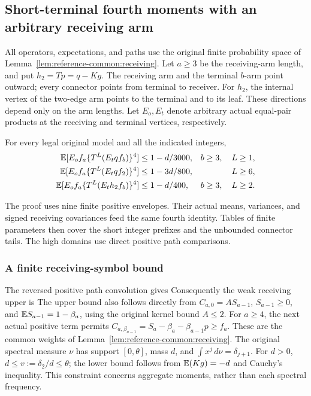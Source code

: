 \subsection{Short-terminal fourth moments with an arbitrary receiving arm}
\label{proof:Q5-C117}

All operators, expectations, and paths use the original finite
probability space of Lemma~\ref{lem:reference-common:receiving}.
Let \(a\ge3\) be the receiving-arm length, and put
\(h_2=Tp=q-Kg\). The receiving arm and the terminal \(b\)-arm
point outward; every connector points from terminal to receiver.
For \(h_2\), the internal vertex of the two-edge arm points to
the terminal and to its leaf. These directions depend only on the
arm lengths. Let \(E_o,E_t\) denote arbitrary actual equal-pair
products at the receiving and terminal vertices, respectively.

\begin{proposition}
\label{prop:q117-unified:families}
For every legal original model and all the indicated integers,
\begin{align}
 \mathbb E[E_of_a\{T^L(E_tqf_b)\}^4]
   &\le1-d/3000,& b\ge3,\quad L\ge1,
   \label{eq:q117-unified:shortone}\\
 \mathbb E[E_of_a\{T^L(E_tqf_2)\}^4]
   &\le1-3d/800,& L\ge6,
   \label{eq:q117-unified:shortone-two-tail}\\
 \mathbb E[E_of_a\{T^L(E_th_2f_b)\}^4]
   &\le1-d/400,& b\ge3,\quad L\ge2.
   \label{eq:q117-unified:shorttwo}
\end{align}
\end{proposition}

The proof uses nine finite positive envelopes. Their actual means,
variances, and signed receiving covariances feed the same fourth
identity. Tables of finite parameters then cover the short integer
prefixes and the unbounded connector tails. The high domains use
direct positive path comparisons.

\subsubsection{A finite receiving-symbol bound}
\label{sec:q117-unified:symbols}

The reversed positive path convolution gives
Consequently the weak receiving upper is
The upper bound also follows directly from
\(C_{a,0}=AS_{a-1}\), \(S_{a-1}\ge0\), and
\(\mathbb E S_{a-1}=1-\beta_a\), using the original kernel bound
\(A\le2\).
For \(a\ge4\), the next actual positive term permits
\(C_{a,\beta_{a-1}}=S_a-\beta_a-\beta_{a-1}p\ge f_a\).
These are the common weights of
Lemma~\ref{lem:reference-common:receiving}.
The original spectral measure \(\nu\) has support
\([0,\theta]\), mass \(d\), and
\(\int x^j\,d\nu=\delta_{j+1}\). For \(d>0\),
\(d\le v:=\delta_2/d\le\theta\); the lower bound follows
from \(\mathbb E(Kg)=-d\) and Cauchy's inequality.
This constraint concerns aggregate moments, rather than each
spectral frequency.


